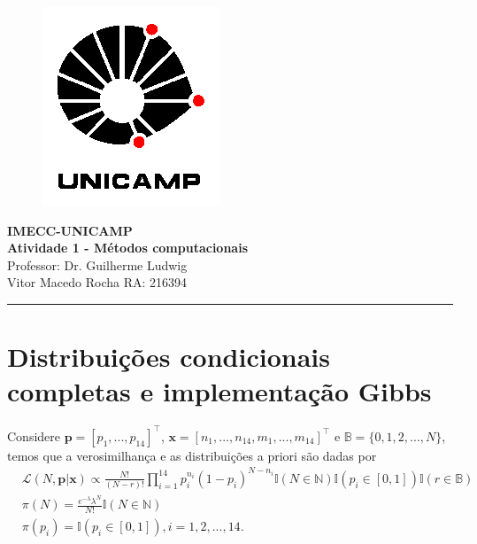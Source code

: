 \documentclass[a4paper,12pt,twoside]{article}
\begin{document}
\thispagestyle{empty}
	\begin{figure}[htb!]
		\begin{flushright}
			\includegraphics[scale=.3]{UNICAMP_logo.jpg} 
		\end{flushright}
	\end{figure}
	\vspace{-3.5cm}
	\hspace{1.5cm}
	\begin{flushleft}
	\begin{minipage}{15cm}
	\textbf{IMECC-UNICAMP\\
	Atividade 1 - Métodos computacionais}\\
	Professor: Dr. Guilherme Ludwig\\
	Vitor Macedo Rocha RA: 216394
	\end{minipage}
	\end{flushleft}
\noindent\rule{17cm}{0.4pt}

\section{Distribuições condicionais completas e implementação Gibbs}

Considere $\mathbf{p}=[p_{1},...,p_{14}]^{\top}$, $\mathbf{x}=[n_1,...,n_{14},m_1,...,m_{14}]^{\top}$ e $\mathbb{B}=\{0,1,2,...,N\}$, temos que a verosimilhança e as distribuições a priori são dadas por
\begin{align}
&\mathcal{L}(N,\mathbf{p}|\mathbf{x})\propto \frac{N!}{(N-r)!}\prod_{i=1}^{14}p_{i}^{n_i}(1-p_i)^{N-n_i}\mathds{I}(N \in \mathbb{N})\mathds{I}(p_i \in [0,1])\mathds{I}(r \in \mathbb{B})\\
&\pi(N)=\frac{e^{-\lambda}\lambda^{N}}{N!} \mathds{I}(N \in \mathbb{N})\\
&\pi(p_i)=\mathds{I}(p_i \in [0,1]) , i=1,2,...,14.
\end{align}
\end{document}
